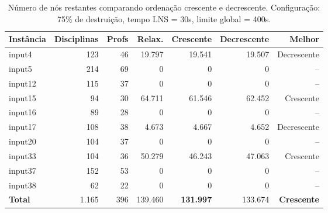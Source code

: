 \begin{table}[htbp]
\centering
\caption{Número de nós restantes comparando ordenação crescente e decrescente. Configuração: 75\% de destruição, tempo LNS = 30s, limite global = 400s.}
\label{tab:lns_order_nodes}
\small
\begin{tabular}{@{}lrrrrrr@{}}
\toprule
\textbf{Instância} & \textbf{Disciplinas} & \textbf{Profs} & \textbf{Relax.} & \textbf{Crescente} & \textbf{Decrescente} & \textbf{Melhor} \\
\midrule
input4  & 123 & 46 & 19.797 & 19.541 & 19.507 & Decrescente \\
input5  & 214 & 69 & 0      & 0      & 0      & -- \\
input12 & 115 & 37 & 0      & 0      & 0      & -- \\
input15 & 94  & 30 & 64.711 & 61.546 & 62.452 & Crescente \\
input16 & 89  & 28 & 0      & 0      & 0      & -- \\
input17 & 108 & 38 & 4.673  & 4.667  & 4.652  & Decrescente \\
input20 & 104 & 37 & 0      & 0      & 0      & -- \\
input33 & 104 & 36 & 50.279 & 46.243 & 47.063 & Crescente \\
input37 & 152 & 53 & 0      & 0      & 0      & -- \\
input38 & 62  & 22 & 0      & 0      & 0      & -- \\
\midrule
\textbf{Total}  & 1.165 & 396 & 139.460 & \textbf{131.997} & 133.674 & \textbf{Crescente} \\
\bottomrule
\end{tabular}
\end{table}


